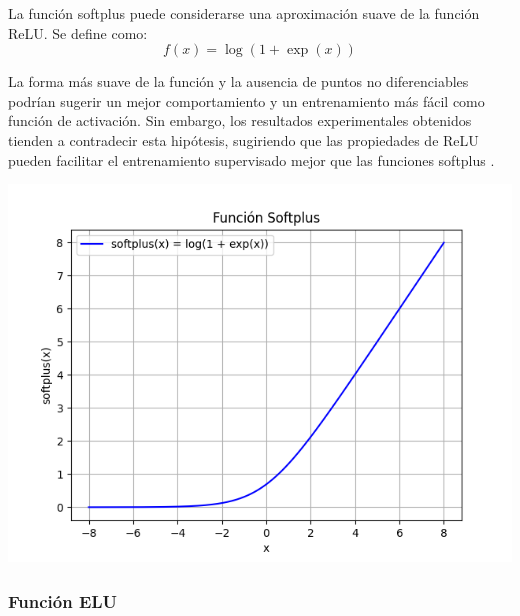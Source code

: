 \begin{minipage}{0.6\textwidth}
    La función softplus puede considerarse una aproximación suave de la función ReLU. Se define como:
\begin{equation}
f(x) = \log(1 + \exp(x))
\end{equation}

La forma más suave de la función y la ausencia de puntos no diferenciables podrían sugerir un mejor comportamiento y un entrenamiento más fácil como función de activación. Sin embargo, los resultados experimentales obtenidos tienden a contradecir esta hipótesis, sugiriendo que las propiedades de ReLU pueden facilitar el entrenamiento supervisado mejor que las funciones softplus \citep{apicella2021survey}.
\end{minipage}
\begin{minipage}{0.05\textwidth}
\textbf{ }
\end{minipage}
\begin{minipage}{0.35\textwidth}
    \includegraphics[width=1.1\textwidth]{img/softplus.png}
    \label{img:softplus}
\end{minipage}


\subsubsection*{Función ELU}

